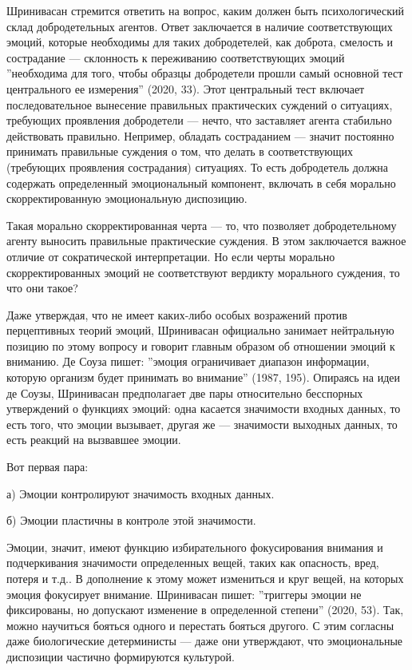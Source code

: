 \documentclass[11pt]{book}
\begin{document}
Шринивасан стремится ответить на вопрос, каким должен быть психологический склад добродетельных агентов. Ответ заключается в наличие соответствующих эмоций, которые необходимы для таких добродетелей, как доброта, смелость и сострадание --- склонность к переживанию соответствующих эмоций ''необходима для того, чтобы образцы добродетели прошли самый основной тест центрального ее измерения'' (2020, 33). Этот центральный тест включает последовательное вынесение правильных практических суждений о ситуациях, требующих проявления добродетели --- нечто, что заставляет агента стабильно действовать правильно. Непример, обладать состраданием --- значит постоянно принимать правильные суждения о том, что делать в соответствующих (требующих проявления сострадания) ситуациях. То есть добродетель должна содержать определенный эмоциональный компонент, включать в себя морально скорректированную эмоциональную диспозицию.

Такая морально скорректированная черта --- то, что позволяет добродетельному агенту выносить правильные практические суждения. В этом заключается важное отличие от сократической интерпретации. Но если черты морально скорректированных эмоций не соответствуют вердикту морального суждения, то что они такое?

Даже утверждая, что не имеет каких-либо особых возражений против перцептивных теорий эмоций, Шринивасан официально занимает нейтральную позицию по этому вопросу и говорит главным образом об отношении эмоций к вниманию. Де Соуза пишет: ''эмоция ограничивает диапазон информации, которую организм будет принимать во внимание'' (1987, 195). Опираясь на идеи де Соузы, Шринивасан предполагает две пары относительно бесспорных утверждений о функциях эмоций: одна касается значимости входных данных, то есть того, что эмоции вызывает, другая же --- значимости выходных данных, то есть реакций на вызвавшее эмоции.

Вот первая пара:

а) Эмоции контролируют значимость входных данных.

б) Эмоции пластичны в контроле этой значимости.

Эмоции, значит, имеют функцию избирательного фокусирования внимания и подчеркивания значимости определенных вещей, таких как опасность, вред, потеря и т.д.. В дополнение к этому может измениться и круг вещей, на которых эмоция фокусирует внимание. Шринивасан пишет: ''триггеры эмоции не фиксированы, но допускают изменение в определенной степени'' (2020, 53). Так, можно научиться бояться одного и перестать бояться другого. С этим согласны даже биологические детерминисты --- даже они утверждают, что эмоциональные диспозиции частично формируются культурой.
\end{document}

